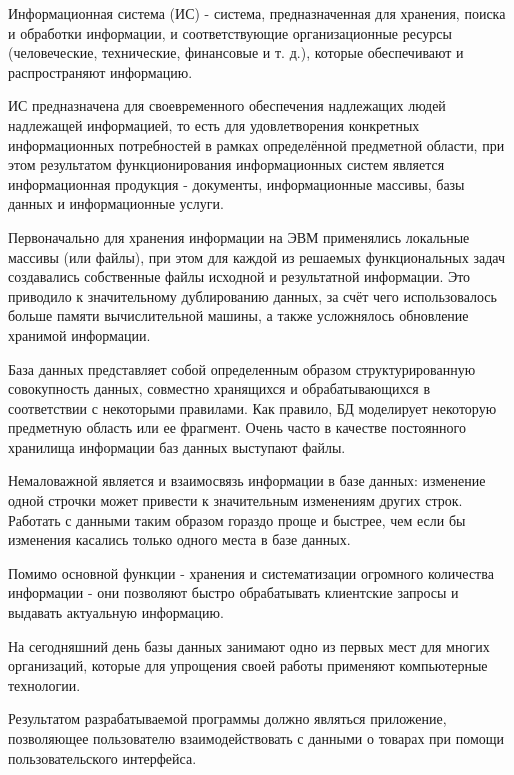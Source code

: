 Информационная система (ИС) - система, предназначенная для хранения, поиска и обработки информации,
и соответствующие организационные ресурсы (человеческие, технические, финансовые и т. д.),
которые обеспечивают и распространяют информацию.

ИС предназначена для своевременного обеспечения надлежащих людей надлежащей информацией,
то есть для удовлетворения конкретных информационных потребностей в рамках определённой
предметной области, при этом результатом функционирования информационных систем является
информационная продукция - документы, информационные массивы, базы данных и информационные услуги.

Первоначально для хранения информации на ЭВМ применялись локальные массивы (или файлы),
при этом для каждой из решаемых функциональных задач создавались собственные файлы исходной
и результатной информации. Это приводило к значительному дублированию данных,
за счёт чего использовалось больше памяти вычислительной машины,
а также усложнялось обновление хранимой информации.

База данных представляет собой определенным образом структурированную совокупность данных,
совместно хранящихся и обрабатывающихся в соответствии с некоторыми правилами.
Как правило, БД моделирует некоторую предметную область или ее фрагмент.
Очень часто в качестве постоянного хранилища информации баз данных выступают файлы.

Немаловажной является и взаимосвязь информации в базе данных: изменение одной строчки
может привести к значительным изменениям других строк.
Работать с данными таким образом гораздо проще и быстрее,
чем если бы изменения касались только одного места в базе данных.

Помимо основной функции - хранения и систематизации огромного количества информации - они
позволяют быстро обрабатывать клиентские запросы и выдавать актуальную информацию.

На сегодняшний день базы данных занимают одно из первых мест для многих организаций,
которые для упрощения своей работы применяют компьютерные технологии.

Результатом разрабатываемой программы должно являться приложение,
позволяющее пользователю взаимодействовать с данными о товарах при помощи пользовательского интерфейса.

\newpage
